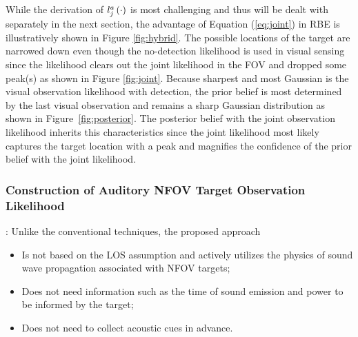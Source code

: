 \documentclass[letterpaper, 10 pt, conference]{ieeeconf}  %
\begin{document}
While the derivation of $l_j^{a} \left ( \cdot \right )$ is most challenging and thus will be dealt with separately in the next section, the advantage of Equation (\ref{eq:joint}) in RBE is illustratively shown in Figure \ref{fig:hybrid}.  The possible locations of the target are narrowed down even though the no-detection likelihood is used in visual sensing since the likelihood clears out the joint likelihood in the FOV and dropped some peak(s) as shown in Figure \ref{fig:joint}. Because sharpest and most Gaussian is the visual observation likelihood with detection, the prior belief is most determined by the last visual observation and remains a sharp Gaussian distribution as shown in Figure~\ref{fig:posterior}.  The posterior belief with the joint observation likelihood inherits this characteristics since the joint likelihood most likely captures the target location with a peak and magnifies the confidence of the prior belief with the joint likelihood.  


\subsubsection{Construction of Auditory NFOV Target Observation Likelihood}

: Unlike the conventional techniques, the proposed approach 
\begin{itemize}
	\item Is not based on the LOS assumption and actively utilizes the physics of sound wave propagation associated with NFOV targets; 
	\item Does not need information such as the time of sound emission and power to be informed by the target;
	\item Does not need to collect acoustic cues in advance. 
\end{itemize}
\end{document}
